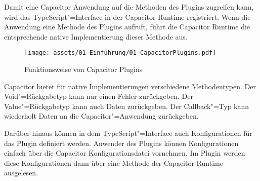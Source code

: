 Damit eine Capacitor Anwendung auf die Methoden des Plugins zugreifen kann, wird das TypeScript"=Interface in der Capacitor Runtime registriert.
Wenn die Anwendung eine Methode des Plugins aufruft, führt die Capacitor Runtime die entsprechende native Implementierung dieser Methode aus.

\begin{figure}[H]
  \centering
  \texttt{[image: assets/01\_Einführung/01\_CapacitorPlugins.pdf]}
  \caption{Funktionsweise von Capacitor Plugins}
\end{figure}

\vspace{-1em}

Capacitor bietet für native Implementierungen verschiedene Methodentypen.
Der Void"=Rückgabetyp kann nur einen Fehler zurückgeben.
Der Value"=Rückgabetyp kann auch Daten zurückgeben.
Der Callback"=Typ kann wiederholt Daten an die Capacitor"=Anwendung zurückgeben.
\cite{capacitor:docs}

Darüber hinaus können in dem TypeScript"=Interface auch Konfigurationen für das Plugin definiert werden.
Anwender des Plugins können Konfigurationen einfach über die Capacitor Konfigurationsdatei vornehmen.
Im Plugin werden diese Konfigurationen dann über eine Methode der Capacitor Runtime ausgelesen.
\cite{capacitor:docs}
